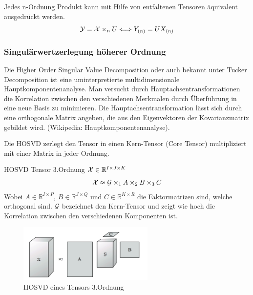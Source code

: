 \begin{Bemerkung}
Jedes n-Ordnung Produkt kann mit Hilfe von entfaltenen Tensoren äquivalent ausgedrückt werden.
\begin{equation}
{\cal Y} = {\cal X} \times_n U \Longleftrightarrow Y_{(n)} = UX_{(n)}
\end{equation}
\end{Bemerkung}

\subsubsection{Singulärwertzerlegung höherer Ordnung}

Die Higher Order Singular Value Decomposition oder auch bekannt unter Tucker Decomposition ist eine uminterpretierte multidimensionale Hauptkomponentenanalyse. Man versucht durch Hauptachsentransformationen die Korrelation zwischen den verschiedenen Merkmalen durch Überführung in eine neue Basis zu minimieren. Die Hauptachsentransformation lässt sich durch eine orthogonale Matrix angeben, die aus den Eigenvektoren der Kovarianzmatrix gebildet wird. (Wikipedia: Hauptkomponentenanalyse).

Die HOSVD zerlegt den Tensor in einen Kern-Tensor (Core Tensor) multipliziert mit einer Matrix in jeder Ordnung. 

\begin{Beispiel} HOSVD Tensor 3.Ordnung
${\cal X}  \in \mathbb{R}^{I \times J \times K}$
\begin{equation}
{\cal X} \approx {\cal G} \times_1 A \times_2 B \times_3 C 
\end{equation}
Wobei $A \in \mathbb{R}^{I \times P}$, $B \in \mathbb{R}^{J \times Q}$ und $C \in \mathbb{R}^{K \times R}$ die Faktormatrizen sind, welche orthogonal sind.
${\cal G}$ bezeichnet den Kern-Tensor und zeigt wie hoch die Korrelation zwischen den verschiedenen Komponenten ist.
\end{Beispiel}

\begin{figure}[ht]
	\centering
  \includegraphics[width=0.6\textwidth]{hosvdTensor.png}
	\caption{HOSVD eines Tensors 3.Ordnung}
	\label{fig:hosvdTensor}
\end{figure}

